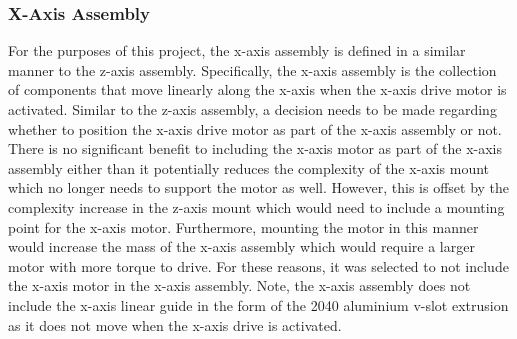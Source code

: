 %






\subsubsection{X-Axis Assembly}

For the purposes of this project, the x-axis assembly is defined in a similar manner to the z-axis assembly. Specifically, the x-axis assembly is the collection of components that move linearly along the x-axis when the x-axis drive motor is activated. Similar to the z-axis assembly, a decision needs to be made regarding whether to position the x-axis drive motor as part of the x-axis assembly or not. There is no significant benefit to including the x-axis motor as part of the x-axis assembly either than it potentially reduces the complexity of the x-axis mount which no longer needs to support the motor as well. However, this is offset by the complexity increase in the z-axis mount which would need to include a mounting point for the x-axis motor. Furthermore, mounting the motor in this manner would increase the mass of the x-axis assembly which would require a larger motor with more torque to drive. For these reasons, it was selected to not include the x-axis motor in the x-axis assembly. Note, the x-axis assembly does not include the x-axis linear guide in the form of the 2040 aluminium v-slot extrusion as it does not move when the x-axis drive is activated.

